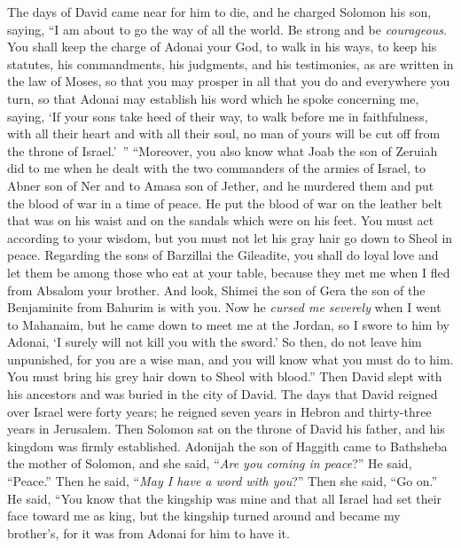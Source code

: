 \begin{biblechapter} %
 The days of David came near for him to die, and he charged Solomon his son, saying,
\verse “I am about to go the way of all the world. Be strong and be \textit{courageous}.
\verse You shall keep the charge of Adonai your God, to walk in his ways, to keep his statutes, his commandments, his judgments, and his testimonies, as are written in the law of Moses, so that you may prosper in all that you do and everywhere you turn,
\verse so that Adonai may establish his word which he spoke concerning me, saying, ‘If your sons take heed of their way, to walk before me in faithfulness, with all their heart and with all their soul, no man of yours will be cut off from the throne of Israel.’ ”
\verse “Moreover, you also know what Joab the son of Zeruiah did to me when he dealt with the two commanders of the armies of Israel, to Abner son of Ner and to Amasa son of Jether, and he murdered them and put the blood of war in a time of peace. He put the blood of war on the leather belt that was on his waist and on the sandals which were on his feet.
\verse You must act according to your wisdom, but you must not let his gray hair go down to Sheol in peace.
\verse Regarding the sons of Barzillai the Gileadite, you shall do loyal love and let them be among those who eat at your table, because they met me when I fled from Absalom your brother.
\verse And look, Shimei the son of Gera the son of the Benjaminite from Bahurim is with you. Now he \textit{cursed me severely} when I went to Mahanaim, but he came down to meet me at the Jordan, so I swore to him by Adonai, ‘I surely will not kill you with the sword.’
\verse So then, do not leave him unpunished, for you are a wise man, and you will know what you must do to him. You must bring his grey hair down to Sheol with blood.”
\verse Then David slept with his ancestors and was buried in the city of David.
\verse The days that David reigned over Israel were forty years; he reigned seven years in Hebron and thirty-three years in Jerusalem.
\verse Then Solomon sat on the throne of David his father, and his kingdom was firmly established.
 Adonijah the son of Haggith came to Bathsheba the mother of Solomon, and she said, “\textit{Are you coming in peace}?” He said, “Peace.”
\verse Then he said, “\textit{May I have a word with you}?” Then she said, “Go on.”
\verse He said, “You know that the kingship was mine and that all Israel had set their face toward me as king, but the kingship turned around and became my brother’s, for it was from Adonai for him to have it.

\end{biblechapter}
